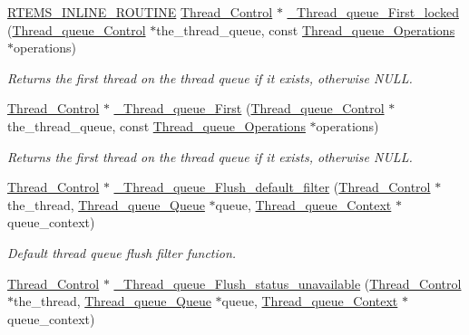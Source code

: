 \begin{DoxyCompactItemize}
\mbox{\hyperlink{group__RTEMSScoreBaseDefs_gac216239df231d5dbd15e3520b0b9313f}{R\+T\+E\+M\+S\+\_\+\+I\+N\+L\+I\+N\+E\+\_\+\+R\+O\+U\+T\+I\+NE}} \mbox{\hyperlink{struct__Thread__Control}{Thread\+\_\+\+Control}} $\ast$ \mbox{\hyperlink{group__RTEMSScoreThreadQueue_gac07672b4b41838966ddf124973f51451}{\+\_\+\+Thread\+\_\+queue\+\_\+\+First\+\_\+locked}} (\mbox{\hyperlink{structThread__queue__Control}{Thread\+\_\+queue\+\_\+\+Control}} $\ast$the\+\_\+thread\+\_\+queue, const \mbox{\hyperlink{structThread__queue__Operations}{Thread\+\_\+queue\+\_\+\+Operations}} $\ast$operations)
\begin{DoxyCompactList}\small\item\em Returns the first thread on the thread queue if it exists, otherwise {\ttfamily N\+U\+LL}. \end{DoxyCompactList}\item 
\mbox{\hyperlink{struct__Thread__Control}{Thread\+\_\+\+Control}} $\ast$ \mbox{\hyperlink{group__RTEMSScoreThreadQueue_ga4408cda9750cde6b1d469759762ecb14}{\+\_\+\+Thread\+\_\+queue\+\_\+\+First}} (\mbox{\hyperlink{structThread__queue__Control}{Thread\+\_\+queue\+\_\+\+Control}} $\ast$the\+\_\+thread\+\_\+queue, const \mbox{\hyperlink{structThread__queue__Operations}{Thread\+\_\+queue\+\_\+\+Operations}} $\ast$operations)
\begin{DoxyCompactList}\small\item\em Returns the first thread on the thread queue if it exists, otherwise {\ttfamily N\+U\+LL}. \end{DoxyCompactList}\item 
\mbox{\hyperlink{struct__Thread__Control}{Thread\+\_\+\+Control}} $\ast$ \mbox{\hyperlink{group__RTEMSScoreThreadQueue_gaf7ba9f035005918f0e5eca4a3cfc92a1}{\+\_\+\+Thread\+\_\+queue\+\_\+\+Flush\+\_\+default\+\_\+filter}} (\mbox{\hyperlink{struct__Thread__Control}{Thread\+\_\+\+Control}} $\ast$the\+\_\+thread, \mbox{\hyperlink{structThread__queue__Queue}{Thread\+\_\+queue\+\_\+\+Queue}} $\ast$queue, \mbox{\hyperlink{structThread__queue__Context}{Thread\+\_\+queue\+\_\+\+Context}} $\ast$queue\+\_\+context)
\begin{DoxyCompactList}\small\item\em Default thread queue flush filter function. \end{DoxyCompactList}\item 
\mbox{\hyperlink{struct__Thread__Control}{Thread\+\_\+\+Control}} $\ast$ \mbox{\hyperlink{group__RTEMSScoreThreadQueue_gafffea388b0a89cc1ba6540a73477130c}{\+\_\+\+Thread\+\_\+queue\+\_\+\+Flush\+\_\+status\+\_\+unavailable}} (\mbox{\hyperlink{struct__Thread__Control}{Thread\+\_\+\+Control}} $\ast$the\+\_\+thread, \mbox{\hyperlink{structThread__queue__Queue}{Thread\+\_\+queue\+\_\+\+Queue}} $\ast$queue, \mbox{\hyperlink{structThread__queue__Context}{Thread\+\_\+queue\+\_\+\+Context}} $\ast$queue\+\_\+context)

\end{DoxyCompactItemize}
